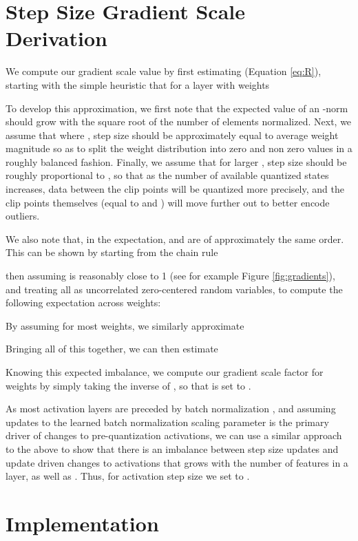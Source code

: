 \documentclass{article}
\begin{document}
\appendix

\section{Step Size Gradient Scale Derivation}
\label{a:gradscale}


We compute our gradient scale value by first estimating  (Equation \ref{eq:R}), starting with the simple heuristic that for a layer with  weights

To develop this approximation, we first note that the expected value of an -norm should grow with the square root of the number of elements normalized.
Next, we assume that where , step size should be approximately equal to average weight magnitude so as to split the weight distribution into zero and non zero values in a roughly balanced fashion.
Finally, we assume that for larger , step size should be roughly proportional to , so that as the number of available quantized states increases, data between the clip points will be quantized more precisely, and the clip points themselves (equal to  and ) will move further out to better encode outliers.

We also note that, in the expectation,  and  are of approximately the same order.
This can be shown by starting from the chain rule

then assuming  is reasonably close to 1 (see for example Figure \ref{fig:gradients}), and treating all  as uncorrelated zero-centered random variables, to compute the following expectation across weights:

By assuming  for most weights, we similarly approximate


Bringing all of this together, we can then estimate

Knowing this expected imbalance, we compute our gradient scale factor for weights by simply taking the inverse of , so that  is set to .

As most activation layers are preceded by batch normalization \citep{ioffe2015batch}, and assuming updates to the learned batch normalization scaling parameter is the primary driver of changes to pre-quantization activations, we can use a similar approach to the above to show that there is an imbalance between step size updates and update driven changes to activations that grows with the number of features in a layer,  as well as .  Thus, for activation step size we set  to .



\section{Implementation}
\end{document}
